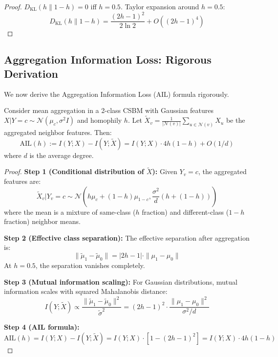 \begin{proof}
$D_{\text{KL}}(h \| 1-h) = 0$ iff $h = 0.5$. Taylor expansion around $h = 0.5$:
\begin{equation}
    D_{\text{KL}}(h \| 1-h) = \frac{(2h-1)^2}{2\ln 2} + O((2h-1)^4)
\end{equation}
\end{proof}

\subsection{Aggregation Information Loss: Rigorous Derivation}

We now derive the Aggregation Information Loss (AIL) formula rigorously.

\begin{theorem}
\label{thm:ail_csbm}
Consider mean aggregation in a 2-class CSBM with Gaussian features $X|Y=c \sim \mathcal{N}(\mu_c, \sigma^2 I)$ and homophily $h$. Let $\tilde{X}_v = \frac{1}{|\mathcal{N}(v)|}\sum_{u \in \mathcal{N}(v)} X_u$ be the aggregated neighbor features. Then:
\begin{equation}
    \text{AIL}(h) := I(Y; X) - I(Y; \tilde{X}) = I(Y; X) \cdot 4h(1-h) + O(1/d)
\end{equation}
where $d$ is the average degree.
\end{theorem}

\begin{proof}
\textbf{Step 1 (Conditional distribution of $\tilde{X}$):}
Given $Y_v = c$, the aggregated features are:
\begin{equation}
    \tilde{X}_v | Y_v = c \sim \mathcal{N}\left(h\mu_c + (1-h)\mu_{1-c}, \frac{\sigma^2}{d}\left(h + (1-h)\right)\right)
\end{equation}
where the mean is a mixture of same-class ($h$ fraction) and different-class ($1-h$ fraction) neighbor means.

\textbf{Step 2 (Effective class separation):}
The effective separation after aggregation is:
\begin{equation}
    \|\tilde{\mu}_1 - \tilde{\mu}_0\| = |2h - 1| \cdot \|\mu_1 - \mu_0\|
\end{equation}
At $h = 0.5$, the separation vanishes completely.

\textbf{Step 3 (Mutual information scaling):}
For Gaussian distributions, mutual information scales with squared Mahalanobis distance:
\begin{equation}
    I(Y; \tilde{X}) \propto \frac{\|\tilde{\mu}_1 - \tilde{\mu}_0\|^2}{\tilde{\sigma}^2} = (2h-1)^2 \cdot \frac{\|\mu_1 - \mu_0\|^2}{\sigma^2/d}
\end{equation}

\textbf{Step 4 (AIL formula):}
\begin{equation}
    \text{AIL}(h) = I(Y; X) - I(Y; \tilde{X}) = I(Y; X) \cdot [1 - (2h-1)^2] = I(Y; X) \cdot 4h(1-h)
\end{equation}
\end{proof}

